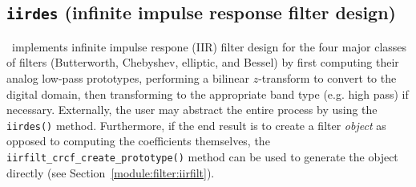 % 
%
\subsection{{\tt iirdes} (infinite impulse response filter design)}
\label{module:filter:iirdes}
\liquid\ implements infinite impulse respone (IIR) filter design for the four
major classes of filters (Butterworth, Chebyshev, elliptic, and Bessel) by
first computing their analog low-pass prototypes, performing a bilinear
$z$-transform to convert to the digital domain, then transforming to the
appropriate band type (e.g. high pass) if necessary.
Externally, the user may abstract the entire process by using the
{\tt iirdes()} method.
Furthermore, if the end result is to create a filter {\em object} as
opposed to computing the coefficients themselves, the
{\tt iirfilt\_crcf\_create\_prototype()} method can be used to generate
the object directly
(see Section~\ref{module:filter:iirfilt}).

